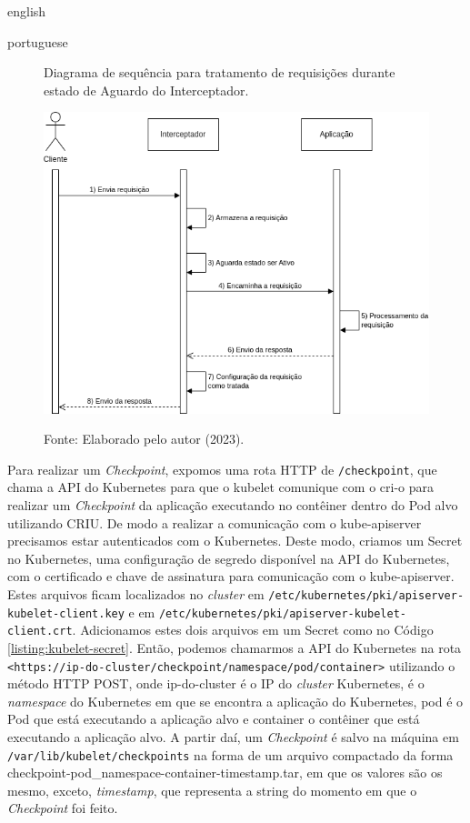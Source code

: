 \begin{otherlanguage*}{english}
\begin{otherlanguage*}{portuguese}
\begin{figure}[h]
\centering
\caption{Diagrama de sequência para tratamento de requisições durante estado de Aguardo do Interceptador.}
\includegraphics[scale=0.64]{images/wait-state.png}
\label{fig:diagram-wait-state-interceptor}
\caption*{Fonte: Elaborado pelo autor (2023).}
\end{figure}

Para realizar um \textit{Checkpoint}, expomos uma rota HTTP de \texttt{/checkpoint}, que
chama a API do Kubernetes para que o kubelet comunique com o cri-o para realizar um 
\textit{Checkpoint} da aplicação executando no contêiner dentro do Pod alvo utilizando
CRIU. De modo a realizar a comunicação com o kube-apiserver precisamos estar autenticados
com o Kubernetes. Deste modo, criamos um Secret no Kubernetes, uma configuração de segredo
disponível na API do Kubernetes, com o certificado e chave de assinatura para comunicação
com o kube-apiserver. Estes arquivos ficam localizados no \textit{cluster} em
\texttt{/etc/kubernetes/pki/apiserver-kubelet-client.key} e em
\texttt{/etc/kubernetes/pki/apiserver-kubelet-client.crt}. Adicionamos estes dois arquivos em um
Secret como no Código \ref{listing:kubelet-secret}. Então, podemos chamarmos a API
do Kubernetes na rota \texttt{<https://ip-do-cluster/checkpoint/namespace/pod/container>}
utilizando o método HTTP POST, onde ip-do-cluster é o IP do \textit{cluster} Kubernetes,
é o \textit{namespace} do Kubernetes em que se encontra a aplicação do Kubernetes, pod é
o Pod que está executando a aplicação alvo e container o contêiner que está executando a
aplicação alvo. A partir daí, um \textit{Checkpoint} é salvo na máquina em
\texttt{/var/lib/kubelet/checkpoints} na forma de um arquivo compactado da forma
checkpoint-pod\_namespace-container-timestamp.tar, em que os valores são os mesmo,
exceto, \textit{timestamp}, que representa a string do momento em que o \textit{Checkpoint}
foi feito.


\end{otherlanguage*}
\end{otherlanguage*}
